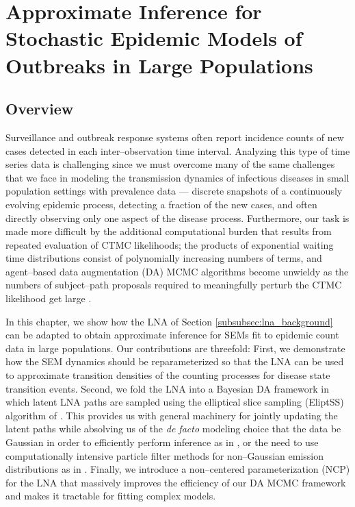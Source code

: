\chapter{Approximate Inference for Stochastic Epidemic Models of Outbreaks in Large Populations}
\label{chap:lna_for_sems}

\section{Overview}
\label{sec:lna_overview}

Surveillance and outbreak response systems often report incidence counts of new cases detected in each inter--observation time interval. Analyzing this type of time series data is challenging since we must overcome many of the same challenges that we face in modeling the transmission dynamics of infectious diseases in small population settings with prevalence data --- discrete snapshots of a continuously evolving epidemic process, detecting a fraction of the new cases, and often directly observing only one aspect of the disease process. Furthermore, our task is made more difficult by the additional computational burden that results from repeated evaluation of CTMC likelihoods; the products of exponential waiting time distributions consist of polynomially increasing numbers of terms, and agent--based data augmentation (DA) MCMC algorithms become unwieldy as the numbers of subject--path proposals required to meaningfully perturb the CTMC likelihood get large \citep{fintzi2017efficient}. 

In this chapter, we show how the LNA of Section \ref{subsubsec:lna_background} can be adapted to obtain approximate inference for SEMs fit to epidemic count data in large populations. Our contributions are threefold: First, we demonstrate how the SEM dynamics should be reparameterized so that the LNA can be used to approximate transition densities of the counting processes for disease state transition events. Second, we fold the LNA into a Bayesian DA framework in which latent LNA paths are sampled using the elliptical slice sampling (EliptSS) algorithm of \cite{murray2010}. This provides us with general machinery for jointly updating the latent paths while absolving us of the \textit{de facto} modeling choice that the data be Gaussian in order to efficiently perform inference as in \cite{fearnhead2014,komorowski2009}, or the need to use computationally intensive particle filter methods for non--Gaussian emission distributions as in \cite{golightly2015delayed}. Finally, we introduce a non--centered parameterization (NCP) for the LNA that massively improves the efficiency of our DA MCMC framework and makes it tractable for fitting complex models. 

